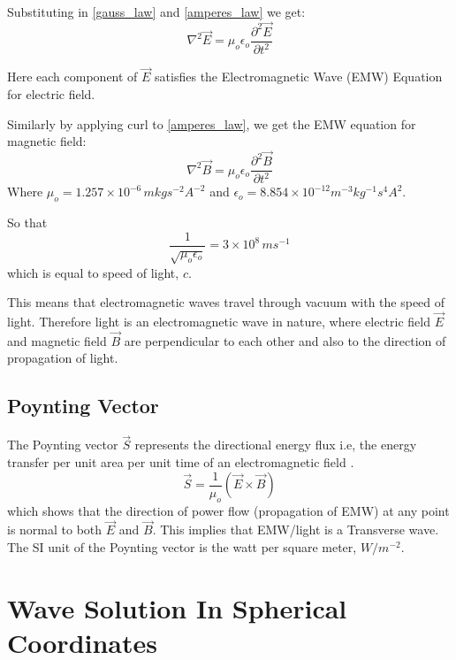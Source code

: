 Substituting in \eqref{gauss_law} and \eqref{amperes_law} we get:
%
   \begin{equation}
   \nabla^2\vec{E} =  \mu_{o}\epsilon_{o}\frac{\partial^2\vec{E}}{\partial t^2}
   \end{equation}

Here each component of $\vec{E}$ satisfies the Electromagnetic Wave (EMW) Equation for electric field.

Similarly by applying curl to \eqref{amperes_law}, we get the EMW equation for magnetic field:
%
   \begin{equation}
   \nabla^2\vec{B} =  \mu_{o}\epsilon_{o}\frac{\partial^2\vec{B}}{\partial t^2}
   \end{equation}
%
Where $\mu_{o} = 1.257\times10^{-6} \, m kg s^{-2} A^{-2}$ and $\epsilon_{o} = 8.854 \times 10^{-12} m^{-3} kg^{-1} s^4 A^2$.

So that
%
   \begin{equation}
   \frac{1}{\sqrt{\mu_{o}\epsilon_{o}}} = 3\times10^8 \, ms^{-1}
   \end{equation}
%
which is equal to speed of light, $c$.

This means that electromagnetic waves travel through vacuum with the speed of light. Therefore light is an electromagnetic wave in nature, where electric field $\vec{E}$ and magnetic field $\vec{B}$ are perpendicular to each other and also to the direction of propagation of light.


\subsection{Poynting Vector}

The Poynting vector $\vec{S}$ represents the directional energy flux i.e, the energy transfer per unit area per unit time of an electromagnetic field \cite{wang1986electromagnetic}.
%
   \begin{equation}\label{eqn:poynting}
      \vec{S} = \frac{1}{\mu_{o}}(\vec{E}\times\vec{B})
   \end{equation}
%
which shows that the direction of power flow (propagation of EMW) at any point is normal to both $\vec{E}$ and $\vec{B}$. This implies that EMW/light is a Transverse wave. The SI unit of the Poynting vector is the watt per square meter, $W/m^{-2}$.


\section{Wave Solution In Spherical Coordinates}

